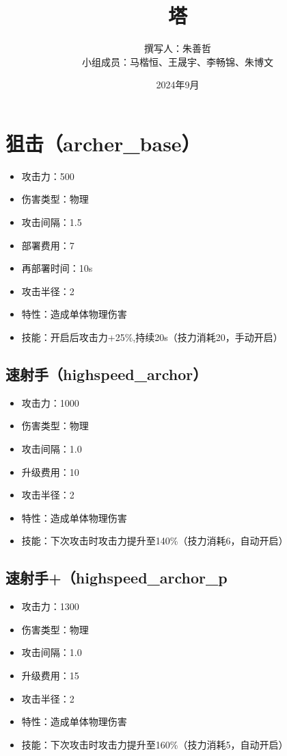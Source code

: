 

	\title{塔}
	\author{撰写人：朱善哲\\小组成员：马楷恒、王晟宇、李畅锦、朱博文}
	\date{2024年9月}
	\maketitle
	\section{狙击（archer\_base）}
		\begin{itemize}
			\item 攻击力：500
			\item 伤害类型：物理
			\item 攻击间隔：1.5
			\item 部署费用：7
			\item 再部署时间：10s
			\item 攻击半径：2
			\item 特性：造成单体物理伤害
			\item 技能：开启后攻击力+25\%,持续20s（技力消耗20，手动开启）
		\end{itemize}
		\subsection{速射手（highspeed\_archor）}
			\begin{itemize}
				\item 攻击力：1000
				\item 伤害类型：物理
				\item 攻击间隔：1.0
				\item 升级费用：10
				\item 攻击半径：2
				\item 特性：造成单体物理伤害
				\item 技能：下次攻击时攻击力提升至140\%（技力消耗6，自动开启）
			\end{itemize}
		\subsection{速射手+（highspeed\_archor\_p}
			\begin{itemize}
				\item 攻击力：1300
				\item 伤害类型：物理
				\item 攻击间隔：1.0
				\item 升级费用：15
				\item 攻击半径：2
				\item 特性：造成单体物理伤害
				\item 技能：下次攻击时攻击力提升至160\%（技力消耗5，自动开启）
			\end{itemize}
